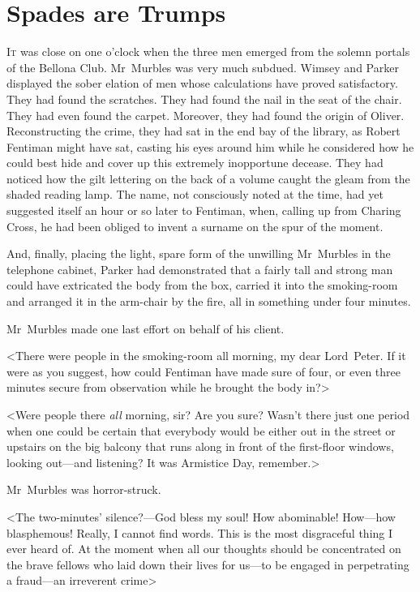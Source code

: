 \chapter{Spades are Trumps}
\lettrine{I}{t} was close on one o'clock when the three men emerged from the solemn portals of the Bellona Club. Mr~Murbles was very much subdued. Wimsey and Parker displayed the sober elation of men whose calculations have proved satisfactory. They had found the scratches. They had found the nail in the seat of the chair. They had even found the carpet. Moreover, they had found the origin of Oliver. Reconstructing the crime, they had sat in the end bay of the library, as Robert Fentiman might have sat, casting his eyes around him while he considered how he could best hide and cover up this extremely inopportune decease. They had noticed how the gilt lettering on the back of a volume caught the gleam from the shaded reading lamp.  The name, not consciously noted at the time, had yet suggested itself an hour or so later to Fentiman, when, calling up from Charing Cross, he had been obliged to invent a surname on the spur of the moment.

And, finally, placing the light, spare form of the unwilling Mr~Murbles in the telephone cabinet, Parker had demonstrated that a fairly tall and strong man could have extricated the body from the box, carried it into the smoking-room and arranged it in the arm-chair by the fire, all in something under four minutes.

Mr~Murbles made one last effort on behalf of his client.

<There were people in the smoking-room all morning, my dear Lord~Peter. If it were as you suggest, how could Fentiman have made sure of four, or even three minutes secure from observation while he brought the body in?>

<Were people there \emph{all} morning, sir? Are you sure? Wasn't there just one period when one could be certain that everybody would be either out in the street or upstairs on the big balcony that runs along in front of the first-floor windows, looking out—and listening? It was Armistice Day, remember.>

Mr~Murbles was horror-struck.

<The two-minutes' silence?—God bless my soul! How abominable! How—how blasphemous! Really, I cannot find words. This is the most disgraceful thing I ever heard of. At the moment when all our thoughts should be concentrated on the brave fellows who laid down their lives for us—to be engaged in perpetrating a fraud—an irreverent crime\longdash>

